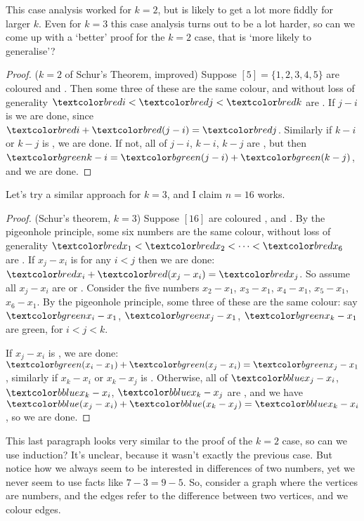 \documentclass{article}
\begin{document}
This case analysis worked for $k=2$, but is likely to get a lot more fiddly for larger $k$.
Even for $k=3$ this case analysis turns out to be a lot harder, so can we come up with a `better' proof for the $k=2$ case, that is `more likely to generalise'?

\begin{proof}($k=2$ of Schur's Theorem, improved)
    Suppose $[5] = \{1, 2, 3, 4, 5\}$ are coloured  and .
    Then some three of these are the same colour, and without loss of generality $\red{i} < \red{j} < \red{k}$ are .
    If $j-i$ is  we are done, since $\red{i} + \red{(j-i)} = \red{j}$.
    Similarly if $k-i$ or $k-j$ is , we are done.
    If not, all of $j-i$, $k-i$, $k-j$ are , but then $\green{k-i} = \green{(j-i)} + \green{(k-j)}$, and we are done.
\end{proof}

Let's try a similar approach for $k=3$, and I claim $n=16$ works.

\begin{proof}(Schur's theorem, $k=3$)
    Suppose $[16]$ are coloured ,  and .
    By the pigeonhole principle, some six numbers are the same colour, without loss of generality $\red{x_1} < \red{x_2} < \dots < \red{x_6}$ are .
    If $x_j - x_i$ is  for any $i<j$ then we are done: $\red{x_i} + \red{(x_j - x_i)} = \red{x_j}$.
    So assume all $x_j - x_i$ are  or .
    Consider the five numbers $x_2 - x_1$, $x_3 - x_1$, $x_4 - x_1$, $x_5 - x_1$, $x_6 - x_1$.
    By the pigeonhole principle, some three of these are the same colour: say $\green{x_i - x_1}$, $\green{x_j - x_1}$, $\green{x_k - x_1}$ are green, for $i < j < k$.

    If $x_j - x_i$ is , we are done: $\green{(x_i - x_1)} + \green{(x_j - x_i)} = \green{x_j - x_1}$, similarly if $x_k - x_i$ or $x_k - x_j$ is .
    Otherwise, all of $\blue{x_j - x_i}$, $\blue{x_k - x_i}$, $\blue{x_k - x_j}$ are , and we have $\blue{(x_j - x_i)} + \blue{(x_k - x_j)} = \blue{x_k - x_i}$, so we are done.
\end{proof}

This last paragraph looks very similar to the proof of the $k=2$ case, so can we use induction? It's unclear, because it wasn't exactly the previous case.  But notice how we always seem to be interested in differences of two numbers, yet we never seem to use facts like $7-3 = 9-5$.
So, consider a graph where the vertices are numbers, and the edges refer to the difference between two vertices, and we colour edges.
\end{document}
